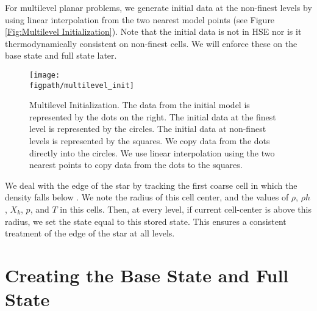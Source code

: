 For multilevel planar problems, we generate
initial data at the non-finest levels by using linear interpolation
from the two nearest model points (see Figure \ref{Fig:Multilevel
  Initialization}).  Note that the initial data is not in HSE nor is
it thermodynamically consistent on non-finest cells.  We will enforce
these on the base state and full state later.
\begin{figure}[tpb]
\centering
\texttt{[image: \\figpath/multilevel\_init]}\hspace{0.2in}
\begin{minipage}[b]{5.0in}
\caption[Multi-level initial model initialization]
 {Multilevel Initialization.  The data from the initial model
  is represented by the dots on the right.  The initial data at the
  finest level is represented by the circles.  The initial data at
  non-finest levels is represented by the squares.  We copy data from
  the dots directly into the circles.  We use linear interpolation
  using the two nearest points to copy data from the dots to the
  squares.\vspace{2em}}
\end{minipage}
\label{Fig:Multilevel Initialization}
\end{figure}

We deal with the edge of the star by tracking the first coarse cell 
in which the density falls below .  We note 
the radius of this cell center, and the values of $\rho$, $\rho h$, $X_k$, 
$p$, and $T$ in this cells.  Then, at every level, if current cell-center 
is above this radius, we set the state equal to this stored state.  This 
ensures a consistent treatment of the edge of the star at all levels.

\section{Creating the Base State and Full State}\label{Sec:Creating the Base State and Full State}

